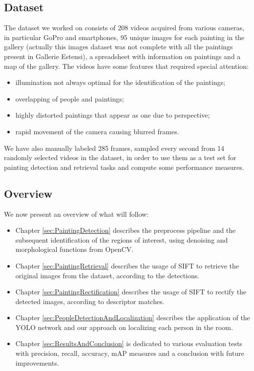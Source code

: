 \documentclass[10pt,twocolumn,letterpaper]{article}
\begin{document}
\subsection{Dataset}
\label{subsec:Dataset}
The dataset we worked on consists of 208 videos acquired from various cameras, in particular GoPro and smartphones, 95 unique images for each painting in the gallery (actually this images dataset was not complete with all the paintings present in Gallerie Estensi), a spreadsheet with information on paintings and a map of the gallery. The videos have some features that required special attention:
\begin{itemize}
    \item illumination not always optimal for the identification of the paintings;
    \item overlapping of people and paintings;
    \item highly distorted paintings that appear as one due to perspective;
    \item rapid movement of the camera causing blurred frames.
\end{itemize}

We have also manually labeled 285 frames, sampled every second from 14 randomly selected videos in the dataset, in order to use them as a test set for painting detection and retrieval tasks and compute some performance measures.

\subsection{Overview}
\label{subsec:Overview}
We now present an overview of what will follow:
\begin{itemize}
    \item Chapter \ref{sec:PaintingDetection} describes the preprocess pipeline and the subsequent identification of the regions of interest, using denoising and morphological functions from OpenCV.
    \item Chapter \ref{sec:PaintingRetrieval} describes the usage of SIFT \cite{10.1023/B:VISI.0000029664.99615.94} to retrieve the original images from the dataset, according to the detections.
    \item Chapter \ref{sec:PaintingRectification} describes the usage of SIFT to rectify the detected images, according to descriptor matches.
    \item Chapter \ref{sec:PeopleDetectionAndLocalization} describes the application of the YOLO \cite{redmon2015unified} network and our approach on localizing each person in the room.
    \item Chapter \ref{sec:ResultsAndConclusion} is dedicated to various evaluation tests with precision, recall, accuracy, mAP measures and a conclusion with future improvements.
\end{itemize}
\end{document}
